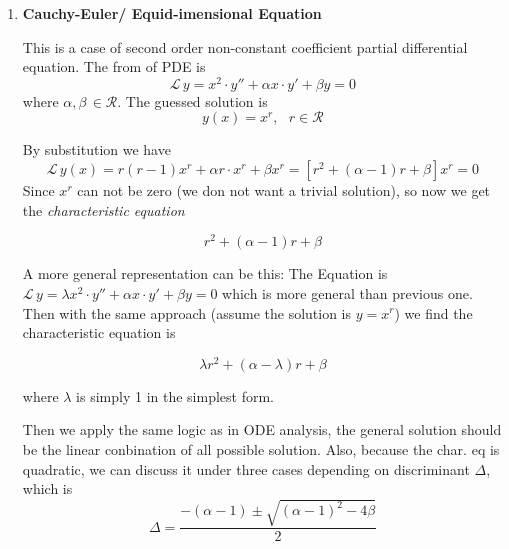\documentclass[10pt]{article}
\newenvironment{changemargin}[2]{%
  \begin{list}{}{%
    \setlength{\topsep}{0pt}%
    \setlength{\leftmargin}{#1}%
    \setlength{\rightmargin}{#2}%
    \setlength{\listparindent}{\parindent}%
    \setlength{\itemindent}{\parindent}%
    \setlength{\parsep}{\parskip}%
  }%
  \item[]}{\end{list}}
\begin{document}
\begin{changemargin}{-0.125in}{0in}



\begin{enumerate}
	
	\item \textbf{Cauchy-Euler/ Equid-imensional Equation}
	
	\medskip
	
	This is a case of second order non-constant coefficient partial differential equation. The from of PDE is 
	\[
	\mathcal{L} \,y = x^2\cdot y'' + \alpha x \cdot y' + \beta y = 0
	\] 
	where $\alpha, \beta \,\in \mathcal{R}$. The guessed solution is 
	\[
	y(x) = x^r,\,\,\,\, r\in \mathcal{R}
	\]
	
	By substitution we have 
	\[
	\mathcal{L}\,y(x) = r(r-1)x^r + \alpha r\cdot x^r + \beta x^r = [r^2 + (\alpha -1) r + \beta] x^r = 0
	\]
	Since $x^r$ can not be zero (we don not want a trivial solution), so now we get the \textit{characteristic equation}
	
	\begin{tcolorbox}[notitle,boxrule=0pt,colback=blue!20,colframe=blue!20]
       \[
       r^2 + (\alpha -1)r + \beta
       \]
       \end{tcolorbox}
       
       
       A more general representation can be this: The Equation is $\mathcal{L}\,y = \lambda x^2\cdot y'' + \alpha x\cdot y' + \beta y = 0$ which is more general than previous one. Then with the same approach (assume the solution is $y = x^r$) we find the characteristic equation is 
       \begin{tcolorbox}[notitle,boxrule=0pt,colback=blue!20,colframe=blue!20]
       \[
       \lambda r^2 + (\alpha - \lambda)r + \beta
       \]
       \end{tcolorbox}
       where $\lambda$ is simply 1 in the simplest form.
       \medskip
       
     Then we apply the same logic as in ODE analysis, the general solution should be the linear conbination of all possible solution. Also, because the char. eq is quadratic, we can discuss it under three cases depending on discriminant $\Delta$, which is 
     \[
     \Delta = \frac{- (\alpha -1) \pm \sqrt{(\alpha - 1)^2 - 4\beta}}{2}
     \]
     

\end{enumerate}
\end{changemargin}
\end{document}
